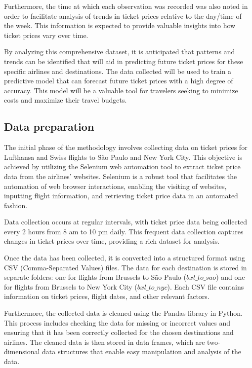 Furthermore, the time at which each observation was recorded was also noted in order to facilitate analysis of trends in ticket prices relative to the day/time of the week.
This information is expected to provide valuable insights into how ticket prices vary over time.

By analyzing this comprehensive dataset, it is anticipated that patterns and trends can be identified that will aid in predicting future ticket prices for these specific airlines and destinations.
The data collected will be used to train a predictive model that can forecast future ticket prices with a high degree of accuracy.
This model will be a valuable tool for travelers seeking to minimize costs and maximize their travel budgets.

\subsection{Data preparation}
\label{sec:data}
The initial phase of the methodology involves collecting data on ticket prices for Lufthansa and Swiss flights to São Paulo and New York City.
This objective is achieved by utilizing the Selenium web automation tool to extract ticket price data from the airlines’ websites.
Selenium is a robust tool that facilitates the automation of web browser interactions, enabling the visiting of websites, inputting flight information, and retrieving ticket price data in an automated fashion.

Data collection occurs at regular intervals, with ticket price data being collected every 2 hours from 8 am to 10 pm daily.
This frequent data collection captures changes in ticket prices over time, providing a rich dataset for analysis.

Once the data has been collected, it is converted into a structured format using CSV (Comma-Separated Values) files.
The data for each destination is stored in separate folders: one for flights from Brussels to São Paulo ($bxl\_to\_sao$) and one for flights from Brussels to New York City ($bxl\_to\_nyc$).
Each CSV file contains information on ticket prices, flight dates, and other relevant factors.

Furthermore, the collected data is cleaned using the Pandas library in Python.
This process includes checking the data for missing or incorrect values and ensuring that it has been correctly collected for the chosen destinations and airlines.
The cleaned data is then stored in data frames, which are two-dimensional data structures that enable easy manipulation and analysis of the data.

